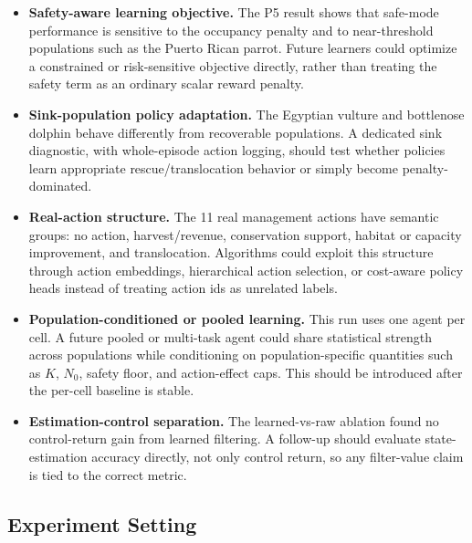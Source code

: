 \documentclass[11pt]{article}
\begin{document}
\begin{itemize}
    \item \textbf{Safety-aware learning objective.} The P5 result shows that
    safe-mode performance is sensitive to the occupancy penalty and to
    near-threshold populations such as the Puerto Rican parrot. Future learners
    could optimize a constrained or risk-sensitive objective directly, rather
    than treating the safety term as an ordinary scalar reward penalty.
    \item \textbf{Sink-population policy adaptation.} The Egyptian vulture and
    bottlenose dolphin behave differently from recoverable populations. A
    dedicated sink diagnostic, with whole-episode action logging, should test
    whether policies learn appropriate rescue/translocation behavior or simply
    become penalty-dominated.
    \item \textbf{Real-action structure.} The 11 real management actions have
    semantic groups: no action, harvest/revenue, conservation support, habitat
    or capacity improvement, and translocation. Algorithms could exploit this
    structure through action embeddings, hierarchical action selection, or
    cost-aware policy heads instead of treating action ids as unrelated labels.
    \item \textbf{Population-conditioned or pooled learning.} This run uses
    one agent per cell. A future pooled or multi-task agent could share
    statistical strength across populations while conditioning on
    population-specific quantities such as $K$, $N_0$, safety floor, and
    action-effect caps. This should be introduced after the per-cell baseline
    is stable.
    \item \textbf{Estimation-control separation.} The learned-vs-raw ablation
    found no control-return gain from learned filtering. A follow-up should
    evaluate state-estimation accuracy directly, not only control return, so
    any filter-value claim is tied to the correct metric.
\end{itemize}

\subsection{Experiment Setting}
\end{document}
